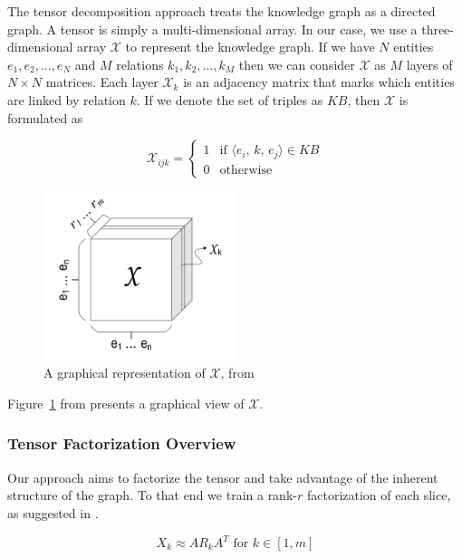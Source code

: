 \documentclass[pageno]{final_paper}
\begin{document}
The tensor decomposition approach treats the knowledge graph as a directed
graph. A tensor is simply a multi-dimensional array. In our case, we use a
three-dimensional array $\mathcal{X}$ to represent the knowledge graph. If we
have $N$ entities $e_1, e_2, ..., e_N$ and $M$ relations $k_1, k_2, ..., k_M$
then we can consider $\mathcal{X}$ as $M$ layers of $N\times N$ matrices. Each
layer $\mathcal{X}_k$ is an adjacency matrix that marks which entities are
linked by relation $k$. If we denote the set of triples as $KB$, then
$\mathcal{X}$ is formulated as

$$
\mathcal{X}_{ijk} =
\begin{cases}
    1 & \text{if } \langle e_i,\,k,\,e_j\rangle \in KB \\
    0 & \text{otherwise}
\end{cases}
$$

\begin{figure}[!tb]
    \centering
    \includegraphics[width=0.5\textwidth,keepaspectratio]{figures/tensor_figure.png}
    \caption{A graphical representation of $\mathcal{X}$, from \cite{Chang2014}}
    \label{fig: tensor figure}
\end{figure}

Figure~\ref{fig: tensor figure} from \cite{Chang2014} presents a graphical view
of $\mathcal{X}$.

\subsubsection{Tensor Factorization Overview}
\label{Tensor Factorization Overview}

Our approach aims to factorize the tensor and take advantage of the inherent
structure of the graph. To that end we train a rank-$r$ factorization of each
slice, as suggested in \cite{Bader2007, Nickel2011}.

$$X_k \approx A R_k A^T \text{ for } k \in [1,m]$$
\end{document}
